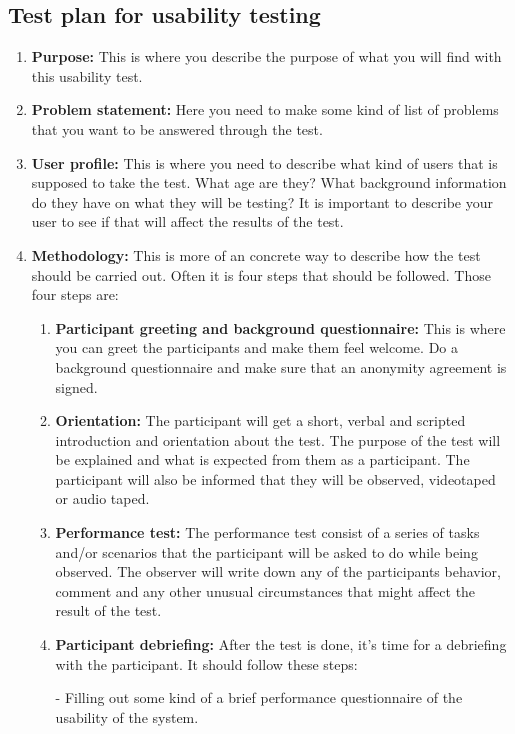 \subsection{Test plan for usability testing}
\begin{enumerate}
  \item \textbf{Purpose:} This is where you describe the purpose of what you will find with this usability test.
  \item \textbf{Problem statement:} Here you need to make some kind of list of problems that you want to be answered through the test.
  \item \textbf{User profile:} This is where you need to describe what kind of users that is supposed to take the test. What age are they? What background information do they have on what they will be testing? It is important to describe your user to see if that will affect the results of the test.
  \item \textbf{Methodology:} This is more of an concrete way to describe how the test should be carried out. Often it is four steps that should be followed. Those four steps are: 
  \begin{enumerate}
  \item \textbf{Participant greeting and background questionnaire:} This is where you can greet the participants and make them feel welcome. Do a background questionnaire and make sure that an anonymity agreement is signed.
  
  \item \textbf{Orientation:} The participant will get a short, verbal and scripted introduction and orientation about the test.
  The purpose of the test will be explained and what is expected from them as a participant. The participant will also be informed that they will be observed, videotaped or audio taped.
  
  \item \textbf{Performance test:} The performance test consist of a series of tasks and/or scenarios that the participant will be asked to do while being observed. The observer will write down any of the participants behavior, comment and any other unusual circumstances that might affect the result of the test.       
  
  \item \textbf{Participant debriefing:} After the test is done, it's time for a debriefing with the participant. It should follow these steps:
  
  - Filling out some kind of a brief performance questionnaire of the usability of the system. 
  

\end{enumerate}
\end{enumerate}
